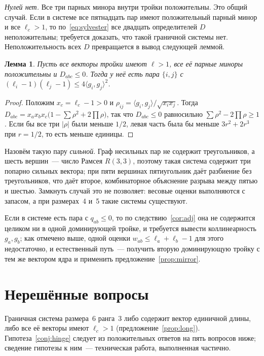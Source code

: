 \documentclass[11pt,a4paper]{article}
\theoremstyle{plain}
\newtheorem{lemma}[theorem]{Лемма}
\theoremstyle{definition}
\theoremstyle{remark}
\begin{document}
\emph{Нулей нет.} Все три парных минора внутри тройки положительны. Это
общий случай. Если в системе все пятнадцать пар имеют положительный парный
минор и все $\ell_c>1$, то по~\eqref{eq:sylvester} все двадцать определителей
$D$ неположительны; требуется доказать, что такой граничной системы нет.
Неположительность всех $D$ превращается в вывод следующей леммой.

\begin{lemma}\label{lem:strongpair}
Пусть все векторы тройки имеют $\ell>1$, все её парные миноры положительны и
$D_{abc}\le0$. Тогда у неё есть пара $\{i,j\}$ с
$(\ell_i-1)(\ell_j-1)\le4\langle g_i,g_j\rangle^2$.
\end{lemma}
\begin{proof}
Положим $x_c=\ell_c-1>0$ и $\rho_{ij}=\langle g_i,g_j\rangle/\sqrt{x_ix_j}$.
Тогда $D_{abc}=x_ax_bx_c\bigl(1-\sum\rho^2+2\prod\rho\bigr)$, так что
$D_{abc}\le0$ равносильно $\sum\rho^2-2\prod\rho\ge1$. Если бы все три
$|\rho|$ были меньше $1/2$, левая часть была бы меньше $3r^2+2r^3$ при $r=1/2$,
то есть меньше единицы.
\end{proof}

Назовём такую пару \emph{сильной}. Граф несильных пар не содержит
треугольников, а шесть вершин~--- число Рамсея $R(3,3)$, поэтому такая система
содержит три попарно сильных вектора; при пяти вершинах пятиугольник даёт
разбиение без треугольников, что даёт второе, комбинаторное объяснение разрыва
между пятью и шестью. Замкнуть случай это не позволяет: весовые оценки
выполняются с запасом, а при размерах~4 и~5 такие системы существуют.

Если в
системе есть пара с $q_{ab}\le0$, то по следствию~\ref{cor:adj} она не
содержится целиком ни в одной доминирующей тройке, и требуется вывести
коллинеарность $g_a,g_b$; как отмечено выше, одной оценки
$w_{ab}\le\ell_a+\ell_b-1$ для этого недостаточно, и естественный путь~---
получить вторую доминирующую тройку с тем же вектором ядра и применить
предложение~\ref{prop:mirror}.

\section{Нерешённые вопросы}\label{sec:list}

Граничная система размера~6 ранга~3 либо содержит вектор единичной длины,
либо все её векторы имеют $\ell_c>1$ (предложение~\ref{prop:long}).
Гипотеза~\ref{conj:hinge} следует из положительных ответов на пять вопросов
ниже; сведение гипотезы к ним~--- техническая работа, выполненная частично.
\end{document}
